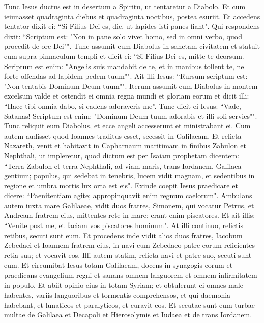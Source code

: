 \begin{biblechapter}   
\verse Tunc Iesus ductus est in desertum a Spiritu, ut tentaretur a Diabolo.  
\verse Et cum ieiunasset quadraginta diebus et quadraginta noctibus, postea esuriit.  
\verse Et accedens tentator dixit ei: “Si Filius Dei es, dic, ut lapides isti panes fiant". 
\verse Qui respondens dixit: “Scriptum est: "Non in pane solo vivet homo, sed in omni verbo, quod procedit de ore Dei"". 
\verse Tunc assumit eum Diabolus in sanctam civitatem et statuit eum supra pinnaculum templi 
\verse et dicit ei: “Si Filius Dei es, mitte te deorsum. Scriptum est enim: "Angelis suis mandabit de te, et in manibus tollent te, ne forte offendas ad lapidem pedem tuum"". 
\verse Ait illi Iesus: “Rursum scriptum est: "Non tentabis Dominum Deum tuum"". 
\verse Iterum assumit eum Diabolus in montem excelsum valde et ostendit ei omnia regna mundi et gloriam eorum 
\verse et dicit illi: “Haec tibi omnia dabo, si cadens adoraveris me”. 
\verse Tunc dicit ei Iesus: “Vade, Satanas! Scriptum est enim: "Dominum Deum tuum adorabis et illi soli servies"". 
\verse Tunc reliquit eum Diabolus, et ecce angeli accesserunt et ministrabant ei. 
\verse Cum autem audisset quod Ioannes traditus esset, secessit in Galilaeam. 
\verse Et relicta Nazareth, venit et habitavit in Capharnaum maritimam 
\verse in finibus Zabulon et Nephthali, ut impleretur, quod dictum est per Isaiam prophetam dicentem: 
\verse “Terra Zabulon et terra Nephthali, ad viam maris, trans Iordanem, Galilaea gentium; 
\verse populus, qui sedebat in tenebris, lucem vidit magnam, et sedentibus in regione et umbra mortis lux orta est eis". 
\verse Exinde coepit Iesus praedicare et dicere: “Paenitentiam agite; appropinquavit enim regnum caelorum". 
\verse Ambulans autem iuxta mare Galilaeae, vidit duos fratres, Simonem, qui vocatur Petrus, et Andream fratrem eius, mittentes rete in mare; erant enim piscatores. 
\verse Et ait illis: “Venite post me, et faciam vos piscatores hominum".  
\verse At illi continuo, relictis retibus, secuti sunt eum. 
\verse Et procedens inde vidit alios duos fratres, Iacobum Zebedaei et Ioannem fratrem eius, in navi cum Zebedaeo patre eorum reficientes retia sua; et vocavit eos. 
\verse Illi autem statim, relicta navi et patre suo, secuti sunt eum. 
\verse Et circumibat Iesus totam Galilaeam, docens in synagogis eorum et praedicans evangelium regni et sanans omnem languorem et omnem infirmitatem in populo.  
\verse Et abiit opinio eius in totam Syriam; et obtulerunt ei omnes male habentes, variis languoribus et tormentis comprehensos, et qui daemonia habebant, et lunaticos et paralyticos, et curavit eos. 
\verse Et secutae sunt eum turbae multae de Galilaea et Decapoli et Hierosolymis et Iudaea et de trans Iordanem. 
\end{biblechapter}

